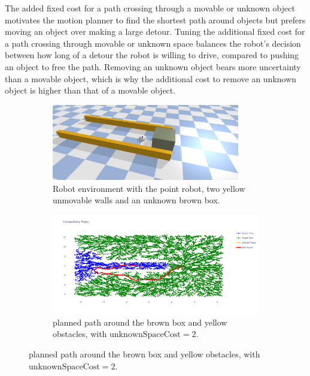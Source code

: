 
The added fixed cost for a path crossing through a movable or unknown object motivates the motion planner to find the shortest path around objects but prefers moving an object over making a large detour. Tuning the additional fixed cost for a path crossing through movable or unknown space balances the robot's decision between how long of a detour the robot is willing to drive, compared to pushing an object to free the path. Removing an unknown object bears more uncertainty than a movable object, which is why the additional cost to remove an unknown object is higher than that of a movable object. 

\begin{figure}[H]

    \centering
    \begin{subfigure}{\textwidth}
    \centering
    \includegraphics[width=0.9\textwidth]{figures/required_background/push_or_drive} \caption{Robot environment with the point robot, two yellow unmovable walls and an unknown brown box.}
    \end{subfigure}

    \begin{subfigure}{1.11\textwidth}
    \centering
    \includegraphics[width=\textwidth]{figures/required_background/mp/mp_high_fixed_cost}
    \caption{planned path around the brown box and yellow obstacles, with $\textrm{unknownSpaceCost} = 2$.}
    \end{subfigure}


\end{figure}
